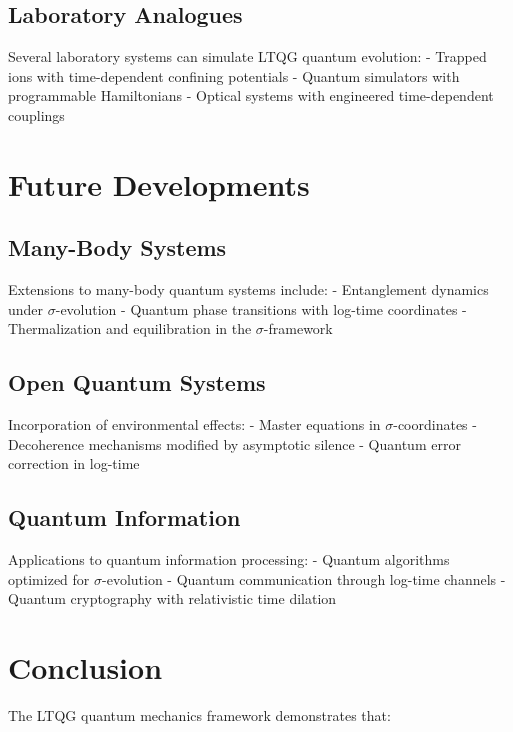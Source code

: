 \documentclass[11pt,a4paper]{article}
\begin{document}
\subsection{Laboratory Analogues}

Several laboratory systems can simulate LTQG quantum evolution:
- Trapped ions with time-dependent confining potentials
- Quantum simulators with programmable Hamiltonians
- Optical systems with engineered time-dependent couplings

\section{Future Developments}

\subsection{Many-Body Systems}

Extensions to many-body quantum systems include:
- Entanglement dynamics under $\sigma$-evolution
- Quantum phase transitions with log-time coordinates
- Thermalization and equilibration in the $\sigma$-framework

\subsection{Open Quantum Systems}

Incorporation of environmental effects:
- Master equations in $\sigma$-coordinates
- Decoherence mechanisms modified by asymptotic silence
- Quantum error correction in log-time

\subsection{Quantum Information}

Applications to quantum information processing:
- Quantum algorithms optimized for $\sigma$-evolution
- Quantum communication through log-time channels
- Quantum cryptography with relativistic time dilation

\section{Conclusion}

The LTQG quantum mechanics framework demonstrates that:
\end{document}
